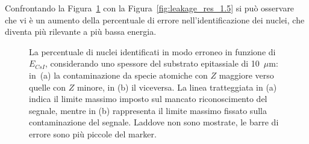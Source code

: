Confrontando la Figura~\ref{fig:leakage_res_substrate} con la Figura~\ref{fig:leakage_res_1.5} si può osservare che vi è un aumento della percentuale di errore nell'identificazione dei nuclei, che diventa più rilevante a più bassa energia.



\begin{figure}[!p] 
	\centering
	\hspace{10mm}
	\caption{La percentuale di nuclei identificati in modo erroneo in funzione di $E_{CsI}$, considerando uno spessore del substrato epitassiale di 10~$\mu$m: in~(a) la contaminazione da specie atomiche con $Z$ maggiore verso quelle con $Z$ minore, in (b) il viceversa. La linea tratteggiata in (a) indica il limite massimo imposto sul mancato riconoscimento del segnale, mentre in (b) rappresenta il limite massimo fissato sulla contaminazione del segnale. Laddove non sono mostrate, le barre di errore sono più piccole del marker.} \label{fig:leakage_res_substrate}
\end{figure}



